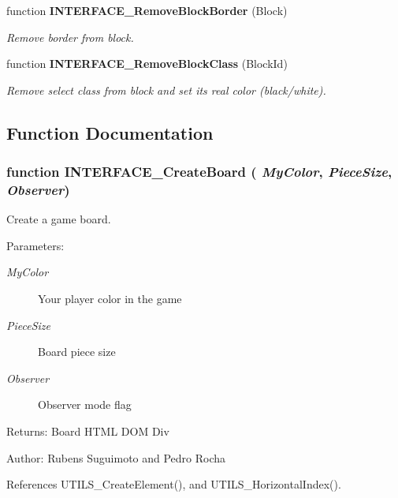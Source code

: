 \begin{CompactItemize}
function {\bf INTERFACE\_\-RemoveBlockBorder} (Block)
\begin{CompactList}\small\item\em Remove border from block. \item\end{CompactList}\item 
function {\bf INTERFACE\_\-RemoveBlockClass} (BlockId)
\begin{CompactList}\small\item\em Remove select class from block and set its real color (black/white). \item\end{CompactList}\end{CompactItemize}


\subsection{Function Documentation}
\subsubsection[INTERFACE\_\-CreateBoard]{\setlength{\rightskip}{0pt plus 5cm}function INTERFACE\_\-CreateBoard ( {\em MyColor}, \/   {\em PieceSize}, \/   {\em Observer})}\label{board_8js_510f2ea85371213a1ac1fac0cdbb58b6}


Create a game board. 

\begin{Desc}
\item[Parameters:]
\begin{description}
\item[{\em MyColor}]Your player color in the game \item[{\em PieceSize}]Board piece size \item[{\em Observer}]Observer mode flag \end{description}
\end{Desc}
\begin{Desc}
\item[Returns:]Board HTML DOM Div \end{Desc}
\begin{Desc}
\item[Author:]Rubens Suguimoto and Pedro Rocha \end{Desc}


References UTILS\_\-CreateElement(), and UTILS\_\-HorizontalIndex().


